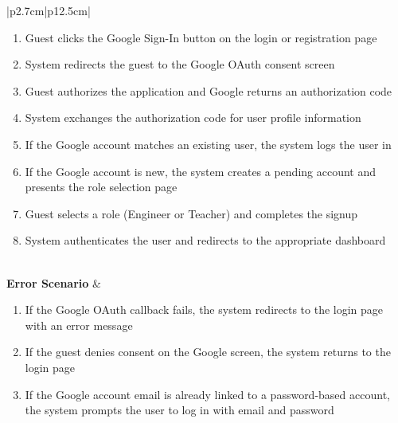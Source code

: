 \begin{table}[H]
\begin{tabular}{|p{2.7cm}|p{12.5cm}|}
\begin{minipage}[t]{\linewidth}
\begin{enumerate}[topsep=0pt,itemsep=1pt,parsep=0pt,partopsep=0pt]
                                          \item Guest clicks the Google Sign-In button on the login or registration page
                                          \item System redirects the guest to the Google OAuth consent screen
                                          \item Guest authorizes the application and Google returns an authorization code
                                          \item System exchanges the authorization code for user profile information
                                          \item If the Google account matches an existing user, the system logs the user in
                                          \item If the Google account is new, the system creates a pending account and presents
                                                the role selection page
                                          \item Guest selects a role (Engineer or Teacher) and completes the signup
                                          \item System authenticates the user and redirects to the appropriate dashboard
                                      \end{enumerate}
                                  \end{minipage}                                                       \\ \hline
        \textbf{Error Scenario} & \begin{minipage}[t]{\linewidth}
                                      \begin{enumerate}[topsep=0pt,itemsep=1pt,parsep=0pt,partopsep=0pt]
                                          \item If the Google OAuth callback fails, the system redirects to the login page with
                                                an error message
                                          \item If the guest denies consent on the Google screen, the system returns to the
                                                login page
                                          \item If the Google account email is already linked to a password-based account, the
                                                system prompts the user to log in with email and password
                                      \end{enumerate}
                                  \end{minipage}                                                       \\ \hline
    \end{tabular}
    \label{tab:guest-google-oauth}
\end{table}
